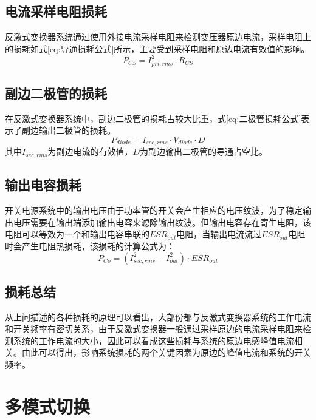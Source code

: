 \subsection{电流采样电阻损耗}

反激式变换器系统通过使用外接电流采样电阻来检测变压器原边电流，采样电阻上的损耗如式\eqref{eq:导通损耗公式}所示，主要受到采样电阻和原边电流有效值的影响。
\begin{equation}
    \label{eq:采样电阻损耗公式}
    P_{CS} = I_{pri,rms}^2  \cdot R_{CS} 
\end{equation}


\subsection{副边二极管的损耗}

在反激式变换器系统中，副边二极管的损耗占较大比重，式\eqref{eq:二极管损耗公式}表示了副边输出二极管的损耗。
\begin{equation}
    \label{eq:二极管损耗公式}
    P_{diode} = I_{sec,rms} \cdot V_{diode} \cdot D 
\end{equation}
其中$I_{sec,rms}$为副边电流的有效值，$D$为副边输出二极管的导通占空比。

\subsection{输出电容损耗}

开关电源系统中的输出电压由于功率管的开关会产生相应的电压纹波，为了稳定输出电压需要在输出端添加输出电容来滤除输出纹波。但输出电容存在寄生电阻，该电阻可以等效为一个和输出电容串联的$ESR_{out}$电阻，当输出电流流过$ESR_{out}$电阻时会产生电阻热损耗，该损耗的计算公式为：
\begin{equation}
    \label{eq:ESR损耗公式}
    P_{Co} = (I_{sec,rms}^2 - I_{out}^2) \cdot ESR_{out}
\end{equation}

\subsection{损耗总结}

从上问描述的各种损耗的原理可以看出，大部份都与反激式变换器系统的工作电流和开关频率有密切关系，由于反激式变换器一般通过采样原边的电流采样电阻来检测系统的工作电流的大小，因此可以看成这些损耗与系统的原边电感峰值电流相关。由此可以得出，影响系统损耗的两个关键因素为原边的峰值电流和系统的开关频率。

\section{多模式切换}
\label{sec:多模式切换}

